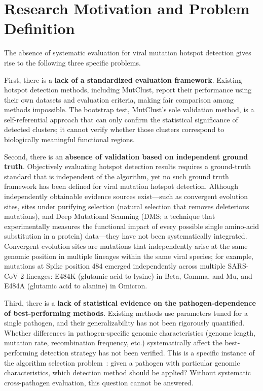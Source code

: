 \section{Research Motivation and Problem Definition}
\label{sec:intro_motivation}

The absence of systematic evaluation for viral mutation hotspot detection gives rise to the following three specific problems.

First, there is a \textbf{lack of a standardized evaluation framework}.
Existing hotspot detection methods, including MutClust, report their performance using their own datasets and evaluation criteria, making fair comparison among methods impossible.
The bootstrap test, MutClust's sole validation method, is a self-referential approach that can only confirm the statistical significance of detected clusters; it cannot verify whether those clusters correspond to biologically meaningful functional regions.

Second, there is an \textbf{absence of validation based on independent ground truth}.
Objectively evaluating hotspot detection results requires a ground-truth standard that is independent of the algorithm, yet no such ground truth framework has been defined for viral mutation hotspot detection.
Although independently obtainable evidence sources exist---such as convergent evolution sites, sites under purifying selection (natural selection that removes deleterious mutations), and Deep Mutational Scanning (DMS; a technique that experimentally measures the functional impact of every possible single amino-acid substitution in a protein) data---they have not been systematically integrated.
Convergent evolution sites are mutations that independently arise at the same genomic position in multiple lineages within the same viral species; for example, mutations at Spike position 484 emerged independently across multiple SARS-CoV-2 lineages: E484K (glutamic acid to lysine) in Beta, Gamma, and Mu, and E484A (glutamic acid to alanine) in Omicron.

Third, there is a \textbf{lack of statistical evidence on the pathogen-dependence of best-performing methods}.
Existing methods use parameters tuned for a single pathogen, and their generalizability has not been rigorously quantified.
Whether differences in pathogen-specific genomic characteristics (genome length, mutation rate, recombination frequency, etc.) systematically affect the best-performing detection strategy has not been verified.
This is a specific instance of the algorithm selection problem~\cite{rice1976algorithm}: given a pathogen with particular genomic characteristics, which detection method should be applied? Without systematic cross-pathogen evaluation, this question cannot be answered.

